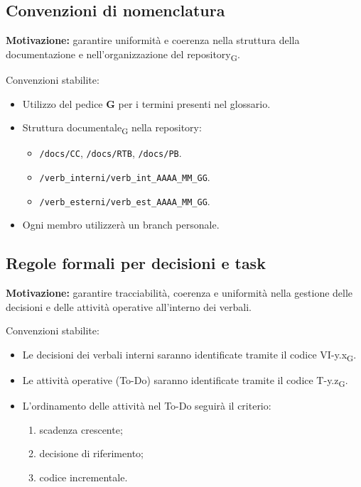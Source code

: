 \subsection{Convenzioni di nomenclatura}
\textbf{Motivazione:} garantire uniformità e coerenza nella struttura della documentazione e nell’organizzazione del repository\textsubscript{G}.

Convenzioni stabilite:
\begin{itemize}
    \item Utilizzo del pedice \textbf{G} per i termini presenti nel glossario.
    \item Struttura documentale\textsubscript{G} nella repository:
    \begin{itemize}
        \item \texttt{/docs/CC}, \texttt{/docs/RTB}, \texttt{/docs/PB}.
        \item \texttt{/verb\_interni/verb\_int\_AAAA\_MM\_GG}.
        \item \texttt{/verb\_esterni/verb\_est\_AAAA\_MM\_GG}.
    \end{itemize}
    \item Ogni membro utilizzerà un branch personale.
\end{itemize}

\subsection{Regole formali per decisioni e task}
\textbf{Motivazione:} garantire tracciabilità, coerenza e uniformità nella gestione delle decisioni e delle attività operative all’interno dei verbali.

Convenzioni stabilite:
\begin{itemize}
    \item Le decisioni dei verbali interni saranno identificate tramite il codice VI-y.x\textsubscript{G}.
    \item Le attività operative (To-Do) saranno identificate tramite il codice T-y.z\textsubscript{G}.
    \item L’ordinamento delle attività nel To-Do seguirà il criterio:
    \begin{enumerate}
        \item scadenza crescente;
        \item decisione di riferimento;
        \item codice incrementale.
    \end{enumerate}
\end{itemize}

